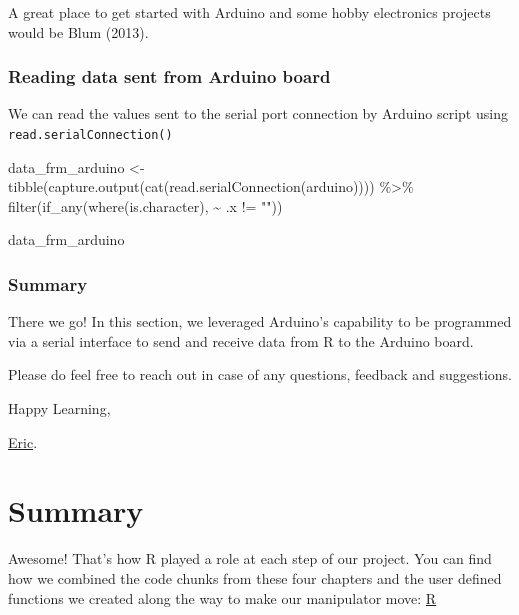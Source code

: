 \documentclass[
  letterpaper,
  DIV=11,
  numbers=noendperiod]{scrreprt}
\newenvironment{Shaded}{\begin{snugshade}}{\end{snugshade}}
\newcommand{\FunctionTok}[1]{\textcolor[rgb]{0.28,0.35,0.67}{#1}}
\newcommand{\NormalTok}[1]{\textcolor[rgb]{0.00,0.23,0.31}{#1}}
\newcommand{\OtherTok}[1]{\textcolor[rgb]{0.00,0.23,0.31}{#1}}
\newcommand{\SpecialCharTok}[1]{\textcolor[rgb]{0.37,0.37,0.37}{#1}}
\newcommand{\StringTok}[1]{\textcolor[rgb]{0.13,0.47,0.30}{#1}}
\begin{document}
A great place to get started with Arduino and some hobby electronics
projects would be Blum (2013).

\hypertarget{reading-data-sent-from-arduino-board}{%
\subsection{\texorpdfstring{\textbf{Reading data sent from Arduino
board}}{Reading data sent from Arduino board}}\label{reading-data-sent-from-arduino-board}}

We can read the values sent to the serial port connection by Arduino
script using \texttt{read.serialConnection()}

\begin{Shaded}
\begin{Highlighting}[]
\NormalTok{data\_frm\_arduino }\OtherTok{\textless{}{-}} \FunctionTok{tibble}\NormalTok{(}\FunctionTok{capture.output}\NormalTok{(}\FunctionTok{cat}\NormalTok{(}\FunctionTok{read.serialConnection}\NormalTok{(arduino)))) }\SpecialCharTok{\%\textgreater{}\%} 
  \FunctionTok{filter}\NormalTok{(}\FunctionTok{if\_any}\NormalTok{(}\FunctionTok{where}\NormalTok{(is.character), }\SpecialCharTok{\textasciitilde{}}\NormalTok{ .x }\SpecialCharTok{!=} \StringTok{""}\NormalTok{))}


\NormalTok{data\_frm\_arduino}
\end{Highlighting}
\end{Shaded}

\hypertarget{summary-2}{%
\subsection{Summary}\label{summary-2}}

There we go! In this section, we leveraged Arduino's capability to be
programmed via a serial interface to send and receive data from R to the
Arduino board.

Please do feel free to reach out in case of any questions, feedback and
suggestions.

Happy Learning,

\href{https://twitter.com/ericntay}{Eric}.


\hypertarget{summary-3}{%
\chapter{Summary}\label{summary-3}}

Awesome! That's how R played a role at each step of our project. You can
find how we combined the code chunks from these four chapters and the
user defined functions we created along the way to make our manipulator
move:
\href{https://github.com/R-icntay/rstudio_conf22_R_in_robotics/tree/main/R}{R}
\end{document}

